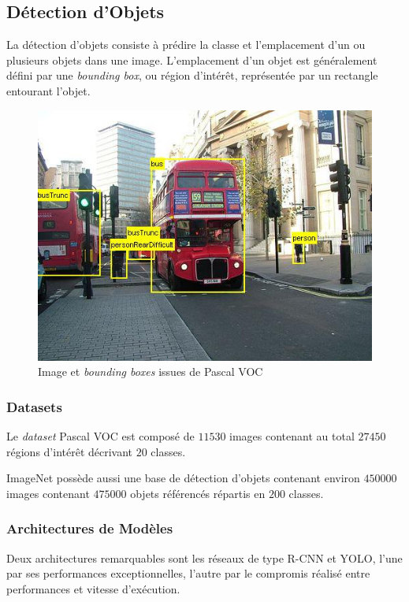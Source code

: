 \documentclass[a4paper, 11pt]{report}
\begin{document}
\subsection{Détection d'Objets}
La détection d'objets consiste à prédire la classe et l'emplacement d'un ou plusieurs objets dans une image. L'emplacement d'un objet est généralement défini par une \emph{bounding box}, ou région d'intérêt, représentée par un rectangle entourant l'objet.
\begin{figure}[H]
	\begin{center}
		\includegraphics[scale=0.3]{Images/Pascal_VOC_Detection.jpg}
		\caption{Image et \emph{bounding boxes} issues de Pascal VOC}
	\end{center}
\end{figure}

\subsubsection{Datasets}
Le \emph{dataset} Pascal VOC est composé de $11530$ images contenant au total $27450$ régions d'intérêt décrivant $20$ classes.

ImageNet possède aussi une base de détection d'objets contenant environ $450000$ images contenant $475000$ objets référencés répartis en $200$ classes.
\subsubsection{Architectures de Modèles}
Deux architectures remarquables sont les réseaux de type R-CNN et YOLO, l'une par ses performances exceptionnelles, l'autre par le compromis réalisé entre performances et vitesse d’exécution.
\end{document}
